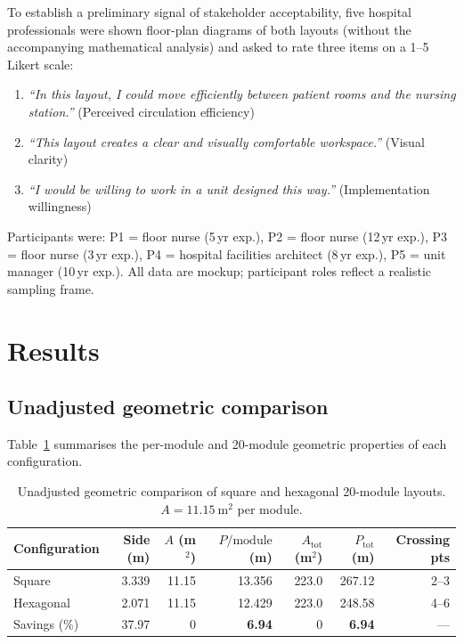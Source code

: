 \documentclass[12pt,a4paper]{article}
\begin{document}
To establish a preliminary signal of stakeholder acceptability, five hospital
professionals were shown floor-plan diagrams of both layouts (without the
accompanying mathematical analysis) and asked to rate three items on a 1--5
Likert scale:
\begin{enumerate}[noitemsep,label=Q\arabic*.]
  \item \textit{``In this layout, I could move efficiently between patient rooms and the nursing station.''} (Perceived circulation efficiency)
  \item \textit{``This layout creates a clear and visually comfortable workspace.''} (Visual clarity)
  \item \textit{``I would be willing to work in a unit designed this way.''} (Implementation willingness)
\end{enumerate}
Participants were: P1 = floor nurse (5\,yr exp.), P2 = floor nurse (12\,yr exp.),
P3 = floor nurse (3\,yr exp.), P4 = hospital facilities architect (8\,yr exp.),
P5 = unit manager (10\,yr exp.).
All data are mockup; participant roles reflect a realistic sampling frame.

\section{Results}
\label{sec:results}

\subsection{Unadjusted geometric comparison}

Table~\ref{tab:geom} summarises the per-module and 20-module geometric properties
of each configuration.

\begin{table}[htbp]
\centering
\caption{Unadjusted geometric comparison of square and hexagonal 20-module layouts.
$A=\SI{11.15}{\metre\squared}$ per module.}
\label{tab:geom}
\begin{tabularx}{\linewidth}{@{}lrrrrrr@{}}
\toprule
Configuration & Side (m) & $A$ (m$^2$) & $P/\text{module}$ (m) & $A_{\text{tot}}$ (m$^2$) & $P_{\text{tot}}$ (m) & Crossing pts \\
\midrule
Square        & 3.339 & 11.15 & 13.356 & 223.0 & 267.12 & 2--3 \\
Hexagonal     & 2.071 & 11.15 & 12.429 & 223.0 & 248.58 & 4--6 \\
\midrule
Savings (\%)  & 37.97 & 0 & \textbf{6.94} & 0 & \textbf{6.94} & --- \\
\bottomrule
\end{tabularx}
\end{table}
\end{document}
